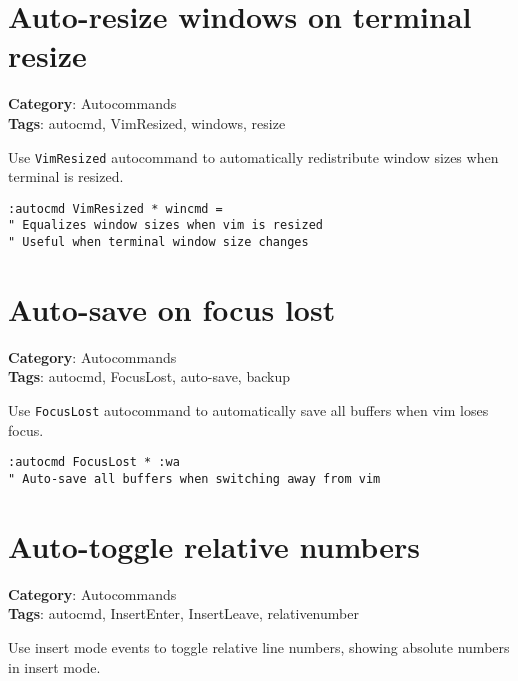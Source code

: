 {\section{Auto-resize windows on terminal resize}

\textbf{Category}: Autocommands\\ \textbf{Tags}: autocmd, VimResized, windows, resize
\vspace{0.5cm}

Use {\footnotesize \Verb§VimResized§} autocommand to automatically redistribute window sizes when terminal is resized.

\begin{Exa*}{}
\begin{Verbatim}[fontsize=\footnotesize, breaklines, breakanywhere]
:autocmd VimResized * wincmd =
" Equalizes window sizes when vim is resized
" Useful when terminal window size changes
\end{Verbatim}
\end{Exa*}

\section{Auto-save on focus lost}

\textbf{Category}: Autocommands\\ \textbf{Tags}: autocmd, FocusLost, auto-save, backup
\vspace{0.5cm}

Use {\footnotesize \Verb§FocusLost§} autocommand to automatically save all buffers when vim loses focus.

\begin{Exa*}{}
\begin{Verbatim}[fontsize=\footnotesize, breaklines, breakanywhere]
:autocmd FocusLost * :wa
" Auto-save all buffers when switching away from vim
\end{Verbatim}
\end{Exa*}

\section{Auto-toggle relative numbers}

\textbf{Category}: Autocommands\\ \textbf{Tags}: autocmd, InsertEnter, InsertLeave, relativenumber
\vspace{0.5cm}

Use insert mode events to toggle relative line numbers, showing absolute numbers in insert mode.

}
